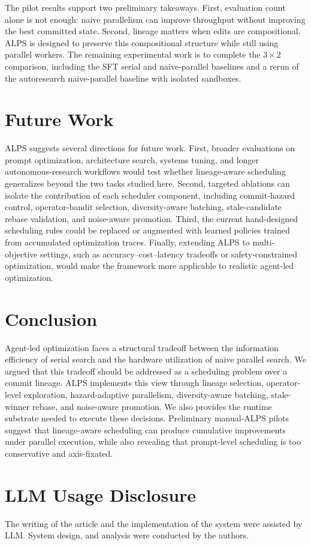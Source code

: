 \documentclass{article}
\newcommand{\alps}{ALPS\xspace}
\begin{document}
The pilot results support two preliminary takeaways. First, evaluation count alone is not enough: naive parallelism can improve throughput without improving the best committed state. Second, lineage matters when edits are compositional. \alps is designed to preserve this compositional structure while still using parallel workers. The remaining experimental work is to complete the $3 \times 2$ comparison, including the SFT serial and naive-parallel baselines and a rerun of the autoresearch naive-parallel baseline with isolated sandboxes.


\section{Future Work}
\label{sec:future}

ALPS suggests several directions for future work. First, broader evaluations on prompt optimization, architecture search, systems tuning, and longer autonomous-research workflows would test whether lineage-aware scheduling generalizes beyond the two tasks studied here. Second, targeted ablations can isolate the contribution of each scheduler component, including commit-hazard control, operator-bandit selection, diversity-aware batching, stale-candidate rebase validation, and noise-aware promotion. Third, the current hand-designed scheduling rules could be replaced or augmented with learned policies trained from accumulated optimization traces. Finally, extending ALPS to multi-objective settings, such as accuracy--cost--latency tradeoffs or safety-constrained optimization, would make the framework more applicable to realistic agent-led optimization.

\section{Conclusion}
\label{sec:conclusion}

Agent-led optimization faces a structural tradeoff between the information efficiency of serial search and the hardware utilization of naive parallel search. We argued that this tradeoff should be addressed as a scheduling problem over a commit lineage. \alps implements this view through lineage selection, operator-level exploration, hazard-adaptive parallelism, diversity-aware batching, stale-winner rebase, and noise-aware promotion. We also provides the runtime substrate needed to execute these decisions. Preliminary manual-\alps pilots suggest that lineage-aware scheduling can produce cumulative improvements under parallel execution, while also revealing that prompt-level scheduling is too conservative and axis-fixated.

\section*{LLM Usage Disclosure}
The writing of the article and the implementation of the system were assisted by LLM. System design, and analysis were conducted by the authors.



\end{document}
